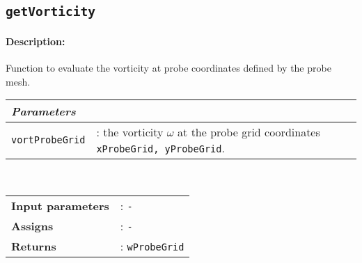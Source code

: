 %
%	
	
	
\subsection{\texttt{getVorticity}}
	\paragraph{Description:} Function to evaluate the vorticity at probe coordinates defined by the probe mesh.\\
	
		\begin{tabular}{lp{10cm}}
			\textit{Parameters} & \\ \hline
			\texttt{vortProbeGrid} &: the vorticity $\omega$ at the probe grid coordinates \texttt{xProbeGrid, yProbeGrid}.\\ 
		\end{tabular} \vspace{5 mm}
	\\
	\begin{tabular}{lp{10cm}}
		\textbf{Input parameters} &: \texttt{-}\\ 
		\textbf{Assigns} &: \texttt{-}\\ 			
		\textbf{Returns} &: \texttt{wProbeGrid}\\ 					
	\end{tabular}


